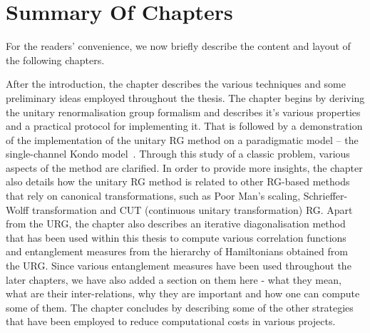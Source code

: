 \section{Summary Of Chapters}

For the readers' convenience, we now briefly describe the content and layout of the following chapters. 

After the introduction, the \hyperref[sec:Methods]{\it \chapB} chapter describes the various techniques and some preliminary ideas employed throughout the thesis.
The chapter begins by deriving the unitary renormalisation group formalism and describes it's various properties and a practical protocol for implementing it. That is followed by a demonstration of the implementation of the unitary RG method on a paradigmatic model -- the single-channel Kondo model~\cite{anirban_kondo}. Through this study of a classic problem, various aspects of the method are clarified.
In order to provide more insights, the chapter also details how the unitary RG method is related to other RG-based methods that rely on canonical transformations, such as Poor Man's scaling, Schrieffer-Wolff transformation and CUT (continuous unitary transformation) RG.
Apart from the URG, the chapter also describes an iterative diagonalisation method that has been used within this thesis to compute various correlation functions and entanglement measures from the hierarchy of Hamiltonians obtained from the URG.
Since various entanglement measures have been used throughout the later chapters, we have also added a section on them here - what they mean, what are their inter-relations, why they are important and how one can compute some of them.
The chapter concludes by describing some of the other strategies that have been employed to reduce computational costs in various projects.

